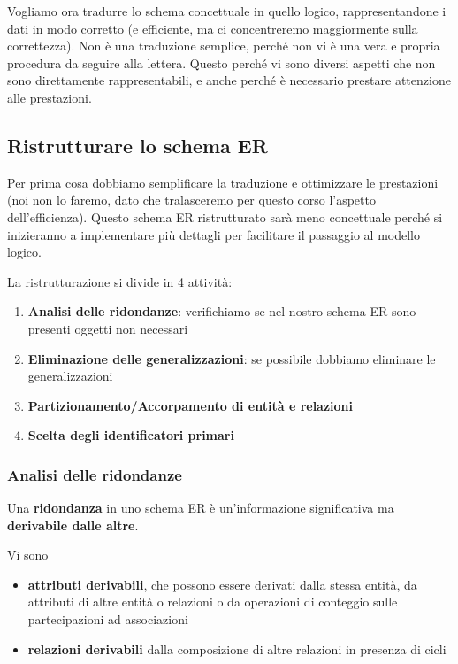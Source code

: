 \documentclass[11pt, a4paper, titlepage, oneside]{scrbook}
\begin{document}
Vogliamo ora tradurre lo schema concettuale in quello logico, rappresentandone i dati in modo corretto (e efficiente, ma ci concentreremo maggiormente sulla correttezza). Non è una traduzione semplice, perché non vi è una vera e propria procedura da seguire alla lettera. Questo perché vi sono diversi aspetti che non sono direttamente rappresentabili, e anche perché è necessario prestare attenzione alle prestazioni.

\subsection{Ristrutturare lo schema ER}

Per prima cosa dobbiamo semplificare la traduzione e ottimizzare le prestazioni (noi non lo faremo, dato che tralasceremo per questo corso l'aspetto dell'efficienza). Questo schema ER ristrutturato sarà meno concettuale perché si inizieranno a implementare più dettagli per facilitare il passaggio al modello logico.

La ristrutturazione si divide in 4 attività:
\begin{enumerate}
    \item \textbf{Analisi delle ridondanze}: verifichiamo se nel nostro schema ER sono presenti oggetti non necessari
    \item \textbf{Eliminazione delle generalizzazioni}: se possibile dobbiamo eliminare le generalizzazioni
    \item \textbf{Partizionamento/Accorpamento di entità e relazioni}
    \item \textbf{Scelta degli identificatori primari}
\end{enumerate}

\subsubsection*{Analisi delle ridondanze}

\begin{Definizione}[Ridondanza]
\label{def-ridondanza}
Una \textbf{ridondanza} in uno schema ER è un'informazione significativa ma \textbf{derivabile dalle altre}. 
\end{Definizione}

Vi sono
\begin{itemize}
    \item \textbf{attributi derivabili}, che possono essere derivati dalla stessa entità, da attributi di altre entità o relazioni o da operazioni di conteggio sulle partecipazioni ad associazioni
    \item \textbf{relazioni derivabili} dalla composizione di altre relazioni in presenza di cicli
\end{itemize}
\end{document}
